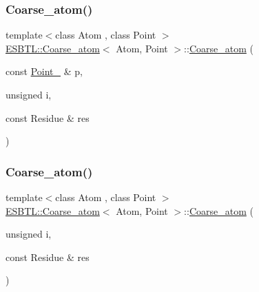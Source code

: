 \subsubsection{\texorpdfstring{Coarse\+\_\+atom()}{Coarse\_atom()}\hspace{0.1cm}{\footnotesize\ttfamily [1/4]}}
{\footnotesize\ttfamily template$<$class Atom , class Point $>$ \\
\hyperlink{classESBTL_1_1Coarse__atom}{E\+S\+B\+T\+L\+::\+Coarse\+\_\+atom}$<$ Atom, Point $>$\+::\hyperlink{classESBTL_1_1Coarse__atom}{Coarse\+\_\+atom} (\begin{DoxyParamCaption}\item[{const \hyperlink{classESBTL_1_1Coarse__atom_acfe6c03e22cc26daef4776e7ca8a7db6}{Point\+\_\+3} \&}]{p,  }\item[{unsigned}]{i,  }\item[{const Residue \&}]{res }\end{DoxyParamCaption})\hspace{0.3cm}{\ttfamily [inline]}}

\mbox{\label{classESBTL_1_1Coarse__atom_a799d08aa0f138973750012a43f6428b9}} 
\subsubsection{\texorpdfstring{Coarse\+\_\+atom()}{Coarse\_atom()}\hspace{0.1cm}{\footnotesize\ttfamily [2/4]}}
{\footnotesize\ttfamily template$<$class Atom , class Point $>$ \\
\hyperlink{classESBTL_1_1Coarse__atom}{E\+S\+B\+T\+L\+::\+Coarse\+\_\+atom}$<$ Atom, Point $>$\+::\hyperlink{classESBTL_1_1Coarse__atom}{Coarse\+\_\+atom} (\begin{DoxyParamCaption}\item[{unsigned}]{i,  }\item[{const Residue \&}]{res }\end{DoxyParamCaption})\hspace{0.3cm}{\ttfamily [inline]}}

\mbox{\label{classESBTL_1_1Coarse__atom_a91362ec8871caea4dcc7b0822bd4be9c}} 
